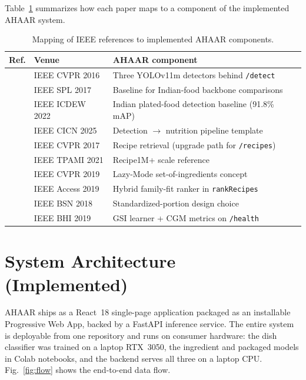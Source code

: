 \documentclass[journal]{IEEEtran}
\begin{document}
\medskip
Table~\ref{tab:papermap} summarizes how each paper maps to a
component of the implemented AHAAR system.

\begin{table}[!tb]
\caption{Mapping of IEEE references to implemented AHAAR components.}
\label{tab:papermap}
\centering
\scriptsize
\setlength{\tabcolsep}{3pt}
\begin{tabularx}{\columnwidth}{l l X}
\toprule
\textbf{Ref.} & \textbf{Venue} & \textbf{AHAAR component} \\
\midrule
\cite{redmon2016yolo}        & IEEE CVPR 2016   & Three YOLOv11m detectors behind \texttt{/detect} \\
\cite{foodnet2017}           & IEEE SPL 2017    & Baseline for Indian-food backbone comparisons \\
\cite{indianfood10}          & IEEE ICDEW 2022  & Indian plated-food detection baseline (91.8\% mAP) \\
\cite{yolov11indian2025}     & IEEE CICN 2025   & Detection $\rightarrow$ nutrition pipeline template \\
\cite{salvador2017im2recipe} & IEEE CVPR 2017   & Recipe retrieval (upgrade path for \texttt{/recipes}) \\
\cite{marin2021recipe1m}     & IEEE TPAMI 2021  & Recipe1M+ scale reference \\
\cite{salvador2019inverse}   & IEEE CVPR 2019   & Lazy-Mode set-of-ingredients concept \\
\cite{yeratoledo2019access}  & IEEE Access 2019 & Hybrid family-fit ranker in \texttt{rankRecipes} \\
\cite{gao2018bsn}            & IEEE BSN 2018    & Standardized-portion design choice \\
\cite{huo2019cgm}            & IEEE BHI 2019    & GSI learner + CGM metrics on \texttt{/health} \\
\bottomrule
\end{tabularx}
\end{table}

\section{System Architecture (Implemented)}
\label{sec:architecture}

AHAAR ships as a React~18 single-page application packaged as an
installable Progressive Web App, backed by a FastAPI inference
service. The entire system is deployable from one repository and runs
on consumer hardware: the dish classifier was trained on a laptop
RTX~3050, the ingredient and packaged models in Colab notebooks, and
the backend serves all three on a laptop CPU. Fig.~\ref{fig:flow} shows the end-to-end data flow.
\end{document}
